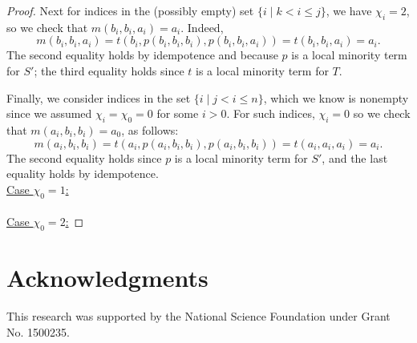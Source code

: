 \begin{proof}
  Next for indices in the (possibly empty) set $\{i \mid k< i \leq j\}$, we have
  $\chi_i = 2$, so we check that $m(b_i, b_i, a_i) = a_i$.  Indeed,
  \[
  m(b_i,b_i,a_i) = t(b_i, p(b_i, b_i, b_i), p(b_i, b_i, a_i)) = t(b_i, b_i, a_i)
  = a_i.
  \]
  The second equality holds by idempotence and because $p$ is a
  local minority term for $S'$; the third equality holds since $t$ is a local minority
  term for $T$.

  Finally, we consider indices in the set $\{i \mid j< i \leq n\}$, which we know is
  nonempty since we assumed $\chi_i = \chi_0 = 0$ for some $i>0$.
  For such indices, $\chi_i=0$ so we check that
  $m(a_i,b_i,b_i)= a_0$, as follows:
  \[
  m(a_i,b_i,b_i) = t(a_i, p(a_i, b_i, b_i), p(a_i, b_i, b_i)) =
   t(a_i, a_i, a_i) =a_i.
  \]
  The second equality holds since $p$ is a local minority term for $S'$,
  and the last equality holds by idempotence.
  \\
  \underline{Case $\chi_0 = 1$:}\\
  \\
  \underline{Case $\chi_0 = 2$:} 
  
  
\end{proof}


\section*{Acknowledgments}
This research was supported by the National Science 
Foundation under Grant No. 1500235.







































































